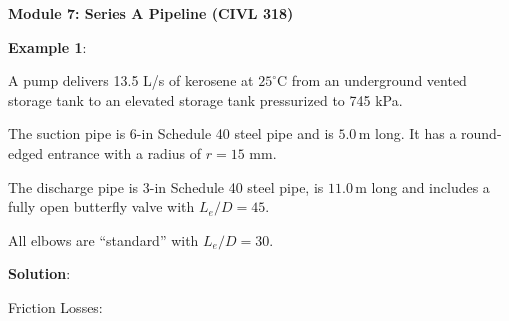 \documentclass[10pt]{amsart}
\begin{document}
\thispagestyle{empty}
\vspace{-7cm}
\centering

\textbf{\Large Module 7: Series A Pipeline (CIVL 318)}
\par\medskip



\raggedright

\begin{multicols}{2}
	
	
	
	
	\textbf{Example 1}:
	
	
	A pump delivers 13.5 L/s of kerosene at $25^\circ$C from an underground vented
	storage tank to an elevated storage tank pressurized to 745 kPa.
	\par
	The suction pipe is 6-in Schedule 40 steel pipe and is $5.0\,\text{m}$ long. It has a round-edged entrance with a radius
	of $r=15$ mm.
	\par
	The discharge pipe is 3-in Schedule 40 steel pipe,  is $11.0\,\text{m}$ long and includes a fully open butterfly valve
	with $L_e/D=45$.
	\par
	All elbows are ``standard'' with $L_e/D=30$.
	
	
	\textbf{Solution}:\parb
	\Large
	
	
	\vfill\columnbreak
	
	Friction Losses:\\
	

\end{multicols}
\end{document}
